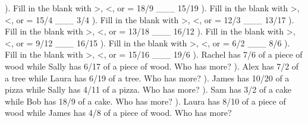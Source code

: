 \documentclass{article}%
\begin{document}
). Fill in the blank with >, <, or = 18/9 \_\_\_ 15/19%
\newline%
\newline%
). Fill in the blank with >, <, or = 15/4 \_\_\_ 3/4%
\newline%
\newline%
). Fill in the blank with >, <, or = 12/3 \_\_\_ 13/17%
\newline%
\newline%
). Fill in the blank with >, <, or = 13/18 \_\_\_ 16/12%
\newline%
\newline%
). Fill in the blank with >, <, or = 9/12 \_\_\_ 16/15%
\newline%
\newline%
). Fill in the blank with >, <, or = 6/2 \_\_\_ 8/6%
\newline%
\newline%
). Fill in the blank with >, <, or = 15/16 \_\_\_ 19/6%
\newline%
\newline%
). Rachel has 7/6 of a piece of wood while Sally has 6/17 of a piece of wood. Who has more?%
\newline%
\newline%
). Alex has 7/2 of a tree while Laura has 6/19 of a tree. Who has more?%
\newline%
\newline%
). James has 10/20 of a pizza while Sally has 4/11 of a pizza. Who has more?%
\newline%
\newline%
). Sam has 3/2 of a cake while Bob has 18/9 of a cake. Who has more?%
\newline%
\newline%
). Laura has 8/10 of a piece of wood while James has 4/8 of a piece of wood. Who has more?%
\newline%
\newline%
\end{document}
